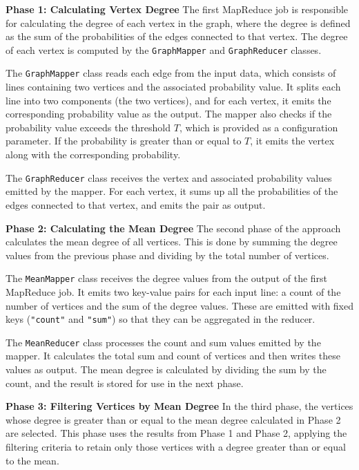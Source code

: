 \documentclass[acmlarge]{acmart}
\begin{document}
\textbf{Phase 1: Calculating Vertex Degree}
The first MapReduce job is responsible for calculating the degree of each vertex in the graph, where the degree is
defined as the sum of the probabilities of the edges connected to that vertex.
The degree of each vertex is computed by the \texttt{GraphMapper} and \texttt{GraphReducer} classes.

The \texttt{GraphMapper} class reads each edge from the input data, which consists of lines containing two vertices
and the associated probability value.
It splits each line into two components (the two vertices), and for each vertex, it emits the corresponding probability
value as the output.
The mapper also checks if the probability value exceeds the threshold \( T \), which is provided as a configuration
parameter.
If the probability is greater than or equal to \( T \), it emits the vertex along with the corresponding probability.

The \texttt{GraphReducer} class receives the vertex and associated probability values emitted by the mapper.
For each vertex, it sums up all the probabilities of the edges connected to that vertex, and emits the pair as output.

\textbf{Phase 2: Calculating the Mean Degree}
The second phase of the approach calculates the mean degree of all vertices.
This is done by summing the degree values from the previous phase and dividing by the total number of vertices.

The \texttt{MeanMapper} class receives the degree values from the output of the first MapReduce job.
It emits two key-value pairs for each input line: a count of the number of vertices and the sum of the degree values.
These are emitted with fixed keys (\texttt{"count"} and \texttt{"sum"}) so that they can be aggregated in the reducer.

The \texttt{MeanReducer} class processes the count and sum values emitted by the mapper.
It calculates the total sum and count of vertices and then writes these values as output.
The mean degree is calculated by dividing the sum by the count, and the result is stored for use in the next phase.

\textbf{Phase 3: Filtering Vertices by Mean Degree}
In the third phase, the vertices whose degree is greater than or equal to the mean degree calculated in Phase 2 are
selected.
This phase uses the results from Phase 1 and Phase 2, applying the filtering criteria to retain only those vertices with
a degree greater than or equal to the mean.
\end{document}
